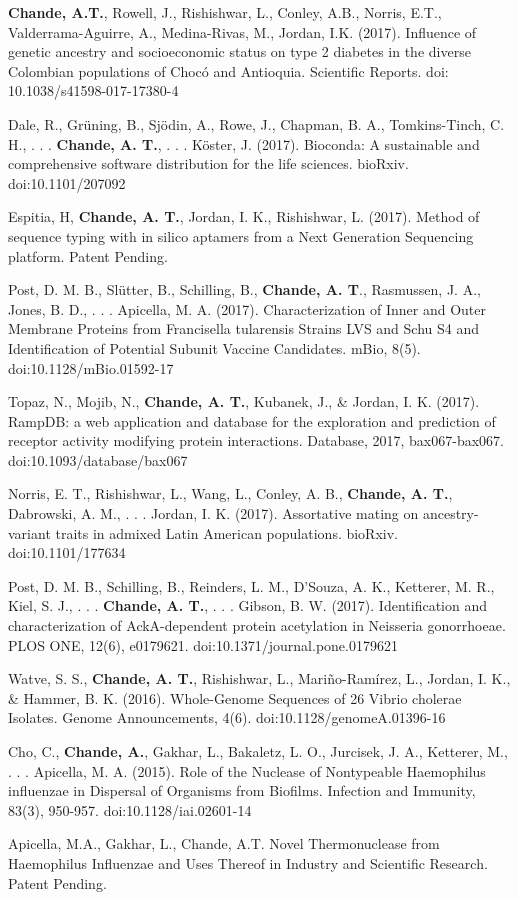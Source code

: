 \documentclass[11pt,letterpaper,sans]{moderncv} %
\begin{document}
\begin{etaremune}
\item \textbf{Chande, A.T.}, Rowell, J., Rishishwar, L., Conley, A.B., Norris, E.T., Valderrama-Aguirre, A., Medina-Rivas, M., Jordan, I.K. (2017). Influence of genetic ancestry and socioeconomic status on type 2 diabetes in the diverse Colombian populations of Chocó and Antioquia. Scientific Reports. doi: 10.1038/s41598-017-17380-4
\item Dale, R., Grüning, B., Sjödin, A., Rowe, J., Chapman, B. A., Tomkins-Tinch, C. H., . . . \textbf{Chande, A. T.}, . . . Köster, J. (2017). Bioconda: A sustainable and comprehensive software distribution for the life sciences. bioRxiv. doi:10.1101/207092
\item Espitia, H, \textbf{Chande, A. T.}, Jordan, I. K., Rishishwar, L. (2017). Method of sequence typing with in silico aptamers from a Next Generation Sequencing platform. Patent Pending.
\item Post, D. M. B., Slütter, B., Schilling, B., \textbf{Chande, A. T}., Rasmussen, J. A., Jones, B. D., . . . Apicella, M. A. (2017). Characterization of Inner and Outer Membrane Proteins from Francisella tularensis Strains LVS and Schu S4 and Identification of Potential Subunit Vaccine Candidates. mBio, 8(5). doi:10.1128/mBio.01592-17
\item Topaz, N., Mojib, N., \textbf{Chande, A. T.}, Kubanek, J., \& Jordan, I. K. (2017). RampDB: a web application and database for the exploration and prediction of receptor activity modifying protein interactions. Database, 2017, bax067-bax067. doi:10.1093/database/bax067
\item Norris, E. T., Rishishwar, L., Wang, L., Conley, A. B., \textbf{Chande, A. T.}, Dabrowski, A. M., . . . Jordan, I. K. (2017). Assortative mating on ancestry-variant traits in admixed Latin American populations. bioRxiv. doi:10.1101/177634
\item Post, D. M. B., Schilling, B., Reinders, L. M., D’Souza, A. K., Ketterer, M. R., Kiel, S. J., . . . \textbf{Chande, A. T.}, . . . Gibson, B. W. (2017). Identification and characterization of AckA-dependent protein acetylation in Neisseria gonorrhoeae. PLOS ONE, 12(6), e0179621. doi:10.1371/journal.pone.0179621
\item Watve, S. S., \textbf{Chande, A. T.}, Rishishwar, L., Mariño-Ramírez, L., Jordan, I. K., \& Hammer, B. K. (2016). Whole-Genome Sequences of 26 Vibrio cholerae Isolates. Genome Announcements, 4(6). doi:10.1128/genomeA.01396-16
\item Cho, C.,\textbf{ Chande, A.}, Gakhar, L., Bakaletz, L. O., Jurcisek, J. A., Ketterer, M., . . . Apicella, M. A. (2015). Role of the Nuclease of Nontypeable Haemophilus influenzae in Dispersal of Organisms from Biofilms. Infection and Immunity, 83(3), 950-957. doi:10.1128/iai.02601-14
\item Apicella, M.A., Gakhar, L., Chande, A.T.  Novel Thermonuclease from Haemophilus Influenzae and Uses Thereof in Industry and Scientific Research. Patent Pending.
\end{etaremune}
\end{document}
